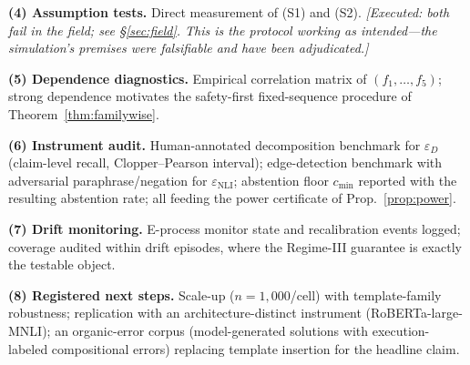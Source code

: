 \textbf{(4) Assumption tests.} Direct measurement of (S1) and (S2).
\emph{[Executed: both fail in the field; see \S\ref{sec:field}. This is the
protocol working as intended---the simulation's premises were falsifiable and
have been adjudicated.]}

\textbf{(5) Dependence diagnostics.} Empirical correlation matrix of
$(f_1,\dots,f_5)$; strong dependence motivates the safety-first
fixed-sequence procedure of Theorem~\ref{thm:familywise}.

\textbf{(6) Instrument audit.} Human-annotated decomposition benchmark for
$\varepsilon_D$ (claim-level recall, Clopper--Pearson interval);
edge-detection benchmark with adversarial paraphrase/negation for
$\varepsilon_{\mathrm{NLI}}$; abstention floor $c_{\min}$ reported with the
resulting abstention rate; all feeding the power certificate of
Prop.~\ref{prop:power}.

\textbf{(7) Drift monitoring.} E-process monitor state and recalibration
events logged; coverage audited within drift episodes, where the Regime-III
guarantee is exactly the testable object.

\textbf{(8) Registered next steps.} Scale-up ($n=1{,}000$/cell) with
template-family robustness; replication with an architecture-distinct
instrument (RoBERTa-large-MNLI); an organic-error corpus (model-generated
solutions with execution-labeled compositional errors) replacing template
insertion for the headline claim.
